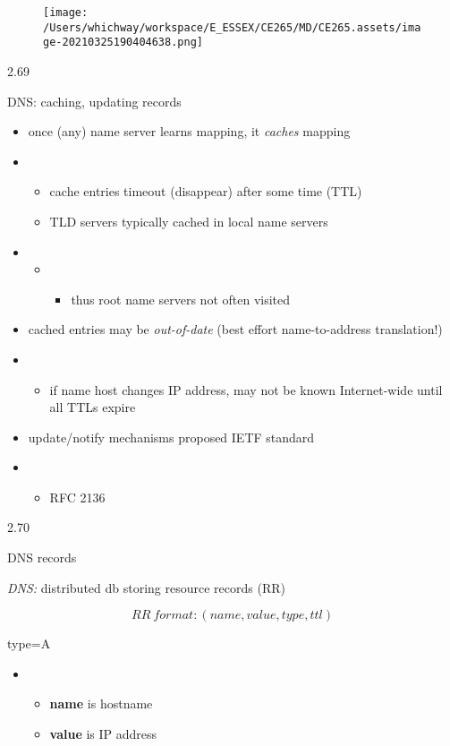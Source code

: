 \documentclass[
]{article}
\begin{document}
\begin{figure}
\centering
\texttt{[image: /Users/whichway/workspace/E\_ESSEX/CE265/MD/CE265.assets/image-20210325190404638.png]}
\caption{}
\end{figure}

2.69

DNS: caching, updating records

\begin{itemize}
\item
  once (any) name server learns mapping, it \emph{caches} mapping
\item
  \begin{itemize}
  \item
    cache entries timeout (disappear) after some time (TTL)
  \item
    TLD servers typically cached in local name servers
  \end{itemize}
\item
  \begin{itemize}
  \item
    \begin{itemize}
    \item
      thus root name servers not often visited
    \end{itemize}
  \end{itemize}
\item
  cached entries may be \emph{out-of-date} (best effort name-to-address
  translation!)
\item
  \begin{itemize}
  \item
    if name host changes IP address, may not be known Internet-wide
    until all TTLs expire
  \end{itemize}
\item
  update/notify mechanisms proposed IETF standard
\item
  \begin{itemize}
  \item
    RFC 2136
  \end{itemize}
\end{itemize}

2.70

DNS records

\emph{DNS:} distributed db storing resource records (RR)

\[RR\ format: (name, value, type, ttl)\]

type=A

\begin{itemize}
\item
  \begin{itemize}
  \item
    \textbf{name} is hostname
  \item
    \textbf{value} is IP address
  \end{itemize}
\end{itemize}
\end{document}
